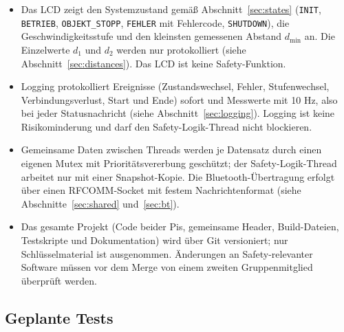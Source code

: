 \begin{itemize}
    \item Das LCD zeigt den Systemzustand gemäß Abschnitt~\ref{sec:states} (\texttt{INIT}, \texttt{BETRIEB}, \texttt{OBJEKT\_STOPP}, \texttt{FEHLER} mit Fehlercode, \texttt{SHUTDOWN}), die Geschwindigkeitsstufe und den kleinsten gemessenen Abstand $d_{\min}$ an. Die Einzelwerte $d_1$ und $d_2$ werden nur protokolliert (siehe Abschnitt~\ref{sec:distances}). Das LCD ist keine Safety-Funktion.
    \item Logging protokolliert Ereignisse (Zustandswechsel, Fehler, Stufenwechsel, Verbindungsverlust, Start und Ende) sofort und Messwerte mit 10 Hz, also bei jeder Statusnachricht (siehe Abschnitt~\ref{sec:logging}). Logging ist keine Risikominderung und darf den Safety-Logik-Thread nicht blockieren.
    \item Gemeinsame Daten zwischen Threads werden je Datensatz durch einen eigenen Mutex mit Prioritätsvererbung geschützt; der Safety-Logik-Thread arbeitet nur mit einer Snapshot-Kopie. Die Bluetooth-Übertragung erfolgt über einen RFCOMM-Socket mit festem Nachrichtenformat (siehe Abschnitte~\ref{sec:shared} und~\ref{sec:bt}).
    \item Das gesamte Projekt (Code beider Pis, gemeinsame Header, Build-Dateien, Testskripte und Dokumentation) wird über Git versioniert; nur Schlüsselmaterial ist ausgenommen. Änderungen an Safety-relevanter Software müssen vor dem Merge von einem zweiten Gruppenmitglied überprüft werden.
\end{itemize}

\subsection{Geplante Tests}

